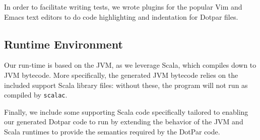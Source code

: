 In order to facilitate writing tests, we wrote plugins for the popular
Vim and Emacs text editors to do code highlighting and indentation for
Dotpar files.

\subsection{Runtime Environment}

Our run-time is based on the JVM, as we leverage Scala, which compiles
down to JVM bytecode. More specifically, the generated JVM bytecode
relies on the included support Scala library files: without these, the
program will not run as compiled by \texttt{scalac}.

Finally, we include some supporting Scala code specifically tailored
to enabling our generated Dotpar code to run by extending the behavior
of the JVM and Scala runtimes to provide the semantics required by the
DotPar code.
